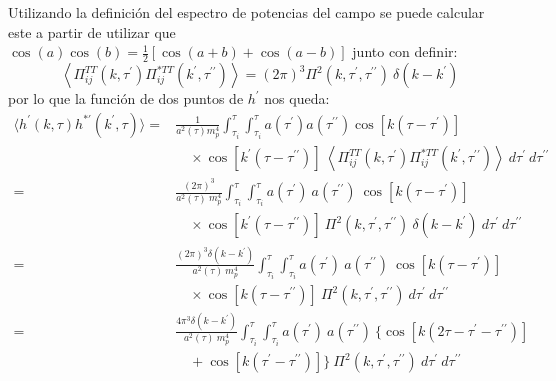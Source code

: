 Utilizando la definición del espectro de potencias del campo se puede calcular este a partir de utilizar que $\displaystyle \cos(a) \cos(b) = \frac{1}{2} \left[ \cos(a + b) + \cos(a - b) \right]$ junto con definir:
\begin{equation}
    \left\langle \Pi^{TT}_{ij} \left( k, \tau^{\prime} \right) \Pi^{*TT}_{ij} \left( k^\prime, \tau^{\prime \prime} \right) \right\rangle  = (2\pi)^3 \Pi^2 \left( k, \tau^\prime, \tau^{\prime \prime} \right) ~ \delta \left( k - k^\prime \right)
\end{equation}
por lo que la función de dos puntos de $h^\prime$ nos queda:
\begin{equation*}
    \begin{split}
        \langle h^\prime \left( k, \tau \right) h^{* \prime} \left( k^\prime, \tau \right) \rangle =& \frac{1}{a^2 (\tau) m_p^4} \int_{\tau_i}^{\tau} \int_{\tau_i}^\tau a \left( \tau^\prime \right) a \left( \tau^{\prime \prime} \right) \cos \left[ k \left( \tau - \tau^\prime \right) \right] \\
        &\quad \times \cos \left[ k^\prime \left( \tau - \tau^{\prime \prime} \right) \right] ~ \left\langle \Pi^{TT}_{ij} \left( k, \tau^{\prime} \right) \Pi^{*TT}_{ij} \left( k^\prime, \tau^{\prime \prime} \right) \right\rangle ~ d\tau^\prime ~ d\tau^{\prime \prime}\\
        =& \frac{(2 \pi)^3}{a^2 (\tau) ~ m_p^4} \int_{\tau_i}^{\tau} \int_{\tau_i}^\tau a \left( \tau^\prime \right) ~ a \left( \tau^{\prime \prime} \right) ~ \cos \left[ k \left( \tau - \tau^\prime \right) \right] \\
        &\quad \times \cos \left[ k^\prime \left( \tau - \tau^{\prime \prime} \right) \right] ~ \Pi^2 \left( k, \tau^\prime, \tau^{\prime \prime} \right) ~ \delta \left( k - k^\prime \right) ~ d\tau^\prime ~ d\tau^{\prime \prime}\\
        =& \frac{(2 \pi)^3 \delta(k - k^\prime)}{a^2 (\tau) ~ m_p^4} \int_{\tau_i}^{\tau} \int_{\tau_i}^\tau a \left( \tau^\prime \right) ~ a \left( \tau^{\prime \prime} \right) ~ \cos \left[ k \left( \tau - \tau^\prime \right) \right] \\
        &\quad \times \cos \left[ k \left( \tau - \tau^{\prime \prime} \right) \right] ~ \Pi^2 \left( k, \tau^\prime, \tau^{\prime \prime} \right) ~ d\tau^\prime ~ d\tau^{\prime \prime}\\
        =& \frac{4 \pi^3 \delta(k - k^\prime)}{a^2 (\tau) ~ m_p^4} \int_{\tau_i}^{\tau} \int_{\tau_i}^\tau a \left( \tau^\prime \right) ~ a \left( \tau^{\prime \prime} \right) ~ \Big\{ \cos \left[ k \left( 2 \tau - \tau^\prime - \tau^{\prime \prime} \right) \right] \\
        &\quad + \cos \left[ k \left( \tau^{\prime} - \tau^{\prime \prime} \right) \right] \Big\} ~ \Pi^2 \left( k, \tau^\prime, \tau^{\prime \prime} \right) ~ d\tau^\prime ~ d\tau^{\prime \prime}
    \end{split}
\end{equation*}
